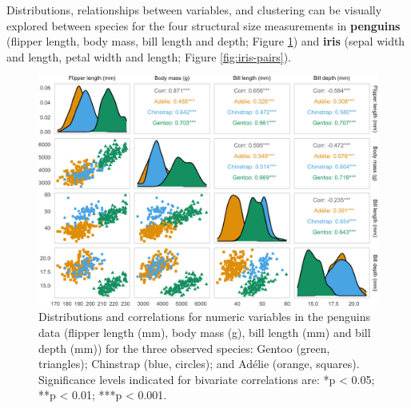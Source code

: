 Distributions, relationships between variables, and clustering can be
visually explored between species for the four structural size
measurements in \textbf{penguins} (flipper length, body mass, bill
length and depth; Figure \ref{fig:penguin-pairs}) and \textbf{iris}
(sepal width and length, petal width and length; Figure
\ref{fig:iris-pairs}).

\begin{Schunk}
\begin{figure}

{\centering \includegraphics[width=1\linewidth]{figs/penguin-pairs-1} 

}

\caption[Distributions and correlations for numeric variables in the penguins data (flipper length (mm), body mass (g), bill length (mm) and bill depth (mm)) for the three observed species]{Distributions and correlations for numeric variables in the penguins data (flipper length (mm), body mass (g), bill length (mm) and bill depth (mm)) for the three observed species: Gentoo (green, triangles); Chinstrap (blue, circles); and Adélie (orange, squares). Significance levels indicated for bivariate correlations are: *p < 0.05; **p < 0.01; ***p < 0.001.}\label{fig:penguin-pairs}
\end{figure}
\end{Schunk}

